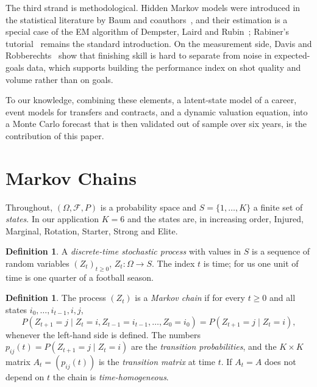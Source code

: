 \documentclass[11pt]{amsart}
\theoremstyle{definition}
\newtheorem{definition}[theorem]{Definition}
\theoremstyle{remark}
\begin{document}
The third strand is methodological. Hidden Markov models were introduced in the statistical literature by Baum and coauthors~\cite{baum}, and their estimation is a special case of the EM algorithm of Dempster, Laird and Rubin~\cite{dlr}; Rabiner's tutorial~\cite{rabiner} remains the standard introduction. On the measurement side, Davis and Robberechts~\cite{davis} show that finishing skill is hard to separate from noise in expected-goals data, which supports building the performance index on shot quality and volume rather than on goals.

To our knowledge, combining these elements, a latent-state model of a career, event models for transfers and contracts, and a dynamic valuation equation, into a Monte Carlo forecast that is then validated out of sample over six years, is the contribution of this paper.

\section{Markov Chains}\label{sec:markov}

Throughout, $(\Omega,\mathcal{F},P)$ is a probability space and $S=\{1,\dots,K\}$ a finite set of \emph{states}. In our application $K=6$ and the states are, in increasing order, Injured, Marginal, Rotation, Starter, Strong and Elite.

\begin{definition}
A \emph{discrete-time stochastic process} with values in $S$ is a sequence of random variables $(Z_t)_{t\ge 0}$, $Z_t:\Omega\to S$. The index $t$ is time; for us one unit of time is one quarter of a football season.
\end{definition}

\begin{definition}\label{def:markov}
The process $(Z_t)$ is a \emph{Markov chain} if for every $t\ge 0$ and all states $i_0,\dots,i_{t-1},i,j$,
\begin{equation}\label{eq:markov}
P(Z_{t+1}=j \mid Z_t=i, Z_{t-1}=i_{t-1},\dots,Z_0=i_0) = P(Z_{t+1}=j\mid Z_t=i),
\end{equation}
whenever the left-hand side is defined. The numbers $p_{ij}(t)=P(Z_{t+1}=j\mid Z_t=i)$ are the \emph{transition probabilities}, and the $K\times K$ matrix $A_t=(p_{ij}(t))$ is the \emph{transition matrix} at time $t$. If $A_t=A$ does not depend on $t$ the chain is \emph{time-homogeneous}.
\end{definition}
\end{document}
